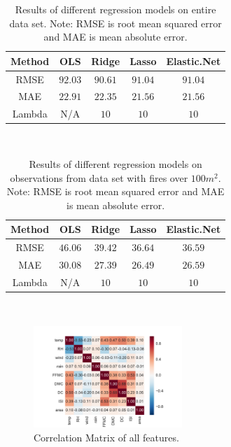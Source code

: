 \documentclass{article}
\begin{document}
\begin{center}
\begin{table}
\begin{tabular}{| c | c | c | c | c |}
\hline
Method & OLS & Ridge & Lasso & Elastic.Net \\
\hline
RMSE & $92.03$ & $90.61$ & $91.04$ & $91.04$ \\
MAE & $22.91$ & $22.35$ & $21.56$ & $21.56$ \\
Lambda & N/A & $10$ & $10$ & $10$ \\
\hline
\end{tabular}
\\
\caption{Results of different regression models on entire data set. Note: RMSE is root mean squared error and MAE is mean absolute error.}
\end{table}
\end{center}

\begin{center}
\begin{table}
\begin{tabular}{| c | c | c | c | c |}
\hline
Method & OLS & Ridge & Lasso & Elastic.Net \\
\hline
RMSE & $46.06$ & $39.42$ & $36.64$ & $36.59$ \\
MAE & $30.08$ & $27.39$ & $26.49$ & $26.59$ \\
Lambda & N/A & $10$ & $10$ & $10$ \\
\hline
\end{tabular}
\\
\caption{Results of different regression models on observations from data set with fires over $100m^2$. Note: RMSE is root mean squared error and MAE is mean absolute error.}
\end{table}
\end{center}

\begin{figure}[!ht]
\begin{flushright}
\includegraphics[width=0.5\textwidth]{images/corr_mat.pdf}
\caption{Correlation Matrix of all features.}
\end{flushright}
\end{figure}
\end{document}
